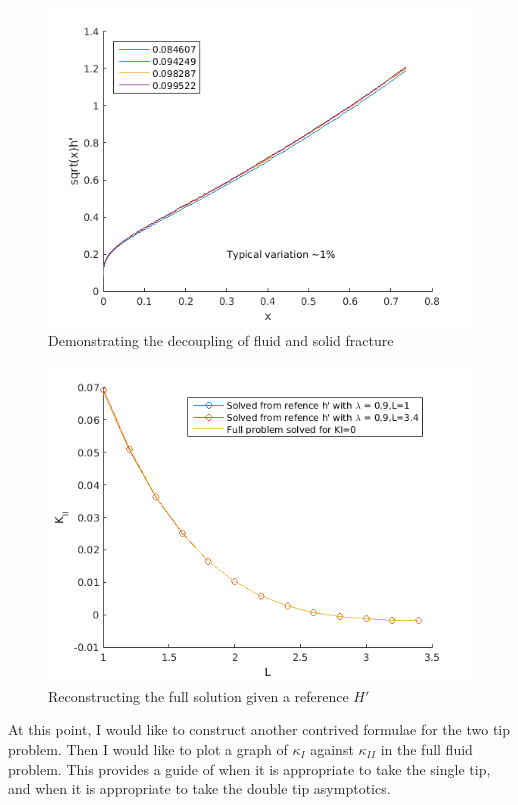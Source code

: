 \documentclass{jfm}
\begin{document}
\begin{figure}
 \centerline{
\includegraphics[scale=0.4]{./../../Graphs/hprime-variation.png}}
  \caption{Demonstrating the decoupling of fluid and solid fracture}
\end{figure}
%
\begin{figure}
 \centerline{
\includegraphics[scale=0.4]{./../../Graphs/fixed-fluid.png}}
  \caption{Reconstructing the full solution given a reference $H'$}
\end{figure}
At this point, I would like to construct another contrived formulae for the
two tip problem. Then I would like to plot a graph of $\kappa_I$ against
$\kappa_{II}$ in the full fluid problem. This provides a guide of when it
is appropriate to take the single tip, and when it is appropriate to take
the double tip asymptotics.
\end{document}
